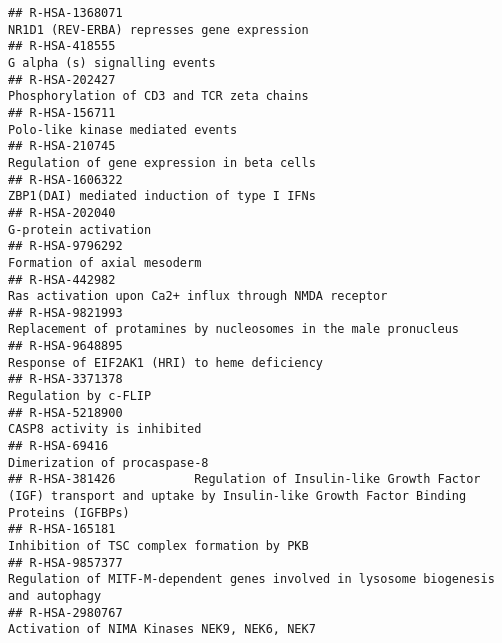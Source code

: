 \documentclass[
]{article}
\begin{document}
\begin{verbatim}
## R-HSA-1368071                                                                                           NR1D1 (REV-ERBA) represses gene expression
## R-HSA-418555                                                                                                         G alpha (s) signalling events
## R-HSA-202427                                                                                            Phosphorylation of CD3 and TCR zeta chains
## R-HSA-156711                                                                                                      Polo-like kinase mediated events
## R-HSA-210745                                                                                           Regulation of gene expression in beta cells
## R-HSA-1606322                                                                                          ZBP1(DAI) mediated induction of type I IFNs
## R-HSA-202040                                                                                                                  G-protein activation
## R-HSA-9796292                                                                                                          Formation of axial mesoderm
## R-HSA-442982                                                                                 Ras activation upon Ca2+ influx through NMDA receptor
## R-HSA-9821993                                                                      Replacement of protamines by nucleosomes in the male pronucleus
## R-HSA-9648895                                                                                         Response of EIF2AK1 (HRI) to heme deficiency
## R-HSA-3371378                                                                                                                 Regulation by c-FLIP
## R-HSA-5218900                                                                                                          CASP8 activity is inhibited
## R-HSA-69416                                                                                                           Dimerization of procaspase-8
## R-HSA-381426           Regulation of Insulin-like Growth Factor (IGF) transport and uptake by Insulin-like Growth Factor Binding Proteins (IGFBPs)
## R-HSA-165181                                                                                            Inhibition of TSC complex formation by PKB
## R-HSA-9857377                                                   Regulation of MITF-M-dependent genes involved in lysosome biogenesis and autophagy
## R-HSA-2980767                                                                                          Activation of NIMA Kinases NEK9, NEK6, NEK7

\end{verbatim}
\end{document}
